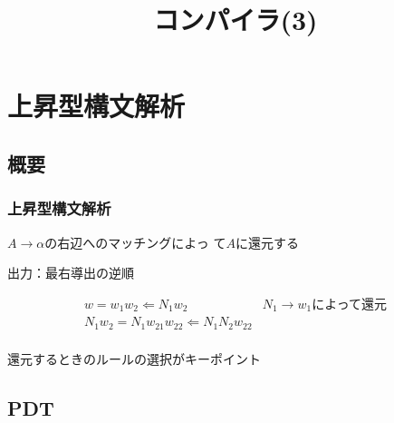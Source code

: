 \documentclass[dvipdfmx]{beamer}
\title{コンパイラ(3)}
\date{\lecturedate}
\begin{document}
\frame{\titlepage}

\section{上昇型構文解析}

\subsection{概要}

\begin{frame}
  \frametitle{上昇型構文解析}
  $A\rightarrow\alpha$の右辺へのマッチングによっ
  て$A$に還元する

  出力：最右導出の逆順\\

  \[
    \begin{array}{cl}
      w = w_1w_2 \Leftarrow N_1w_2                    & \mbox{$N_1\rightarrow w_1$
      によって還元}                                                                      \\
      N_1w_2 = N_1w_{21}w_{22}\Leftarrow N_1N_2w_{22} &                            \\
    \end{array}
  \]



  還元するときのルールの選択がキーポイント
\end{frame}

\subsection{PDT}
\end{document}
